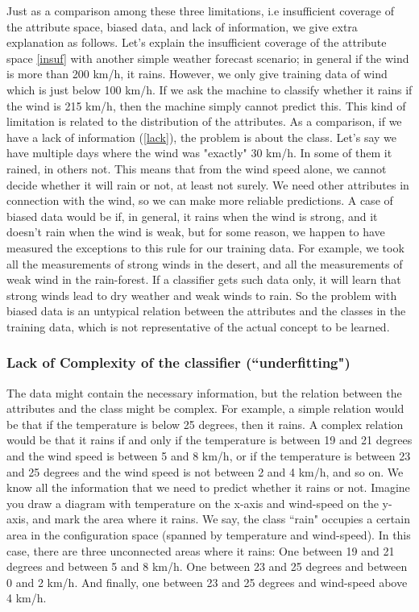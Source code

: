 \documentclass[10pt,a4paper]{article}
\begin{document}
Just as a comparison among  these three limitations, i.e insufficient coverage of the attribute space, biased data, and lack of information, we give extra explanation as follows. Let's explain the insufficient coverage of the attribute space  \ref{insuf} with another  simple weather forecast scenario; in general if the wind is more than 200 km/h, it rains. However, we only give training  data of wind which is just below 100 km/h.  If we  ask the machine to classify whether it rains if the wind is  215 km/h, then the machine simply cannot predict this. This kind of limitation is related to the distribution of the attributes. As a comparison, if we have a lack of information (\ref{lack}), the problem is about the class. Let's say we have multiple days where the wind was "exactly" 30 km/h. In some of them it rained, in others not. This means that from the wind speed alone, we cannot decide whether it will rain or not, at least not surely. We need other attributes in connection with the wind, so we can make more reliable predictions. A case of biased data would be if, in general, it rains when the wind is strong, and it doesn't rain when the wind is weak, but for some reason, we happen to have measured the exceptions to this rule for our training data. For example, we took all the measurements of strong winds in the desert, and all the measurements of weak wind in the rain-forest. If a classifier gets such data only, it will learn that strong winds lead to dry weather and weak winds to rain. So the problem with biased data is an untypical relation between the attributes and the classes in the training data, which is not representative of the actual concept to be learned.
\subsubsection{Lack of Complexity of the classifier (``underfitting")}
The data might contain the necessary information, but the relation between the attributes and the class might be complex. For example, a simple relation would be that if the temperature is below 25 degrees, then it rains. A complex relation would be that it rains if and only if the temperature is between 19 and 21 degrees and the wind speed is between 5 and 8 km/h, or if the temperature is between 23 and 25 degrees and the wind speed is not between 2 and 4 km/h, and so on. We know all the information that we need to predict whether it rains or not.
Imagine you draw a diagram with temperature on the x-axis and wind-speed on the y-axis, and mark the area where it rains. We say, the class ``rain" occupies a certain area in the configuration space (spanned by temperature and wind-speed). In this case, there are three unconnected areas where it rains: One between 19 and 21 degrees and between 5 and 8 km/h. One between 23 and 25 degrees and between 0 and 2 km/h. And finally, one between 23 and 25 degrees and wind-speed above 4 km/h.
\end{document}
